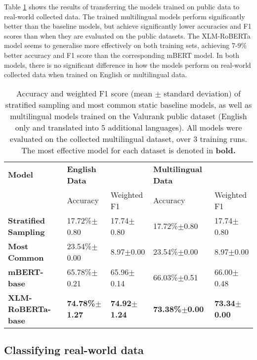 \documentclass{l4proj}
\begin{document}
Table \ref{table:transferability} shows the results of transferring the models trained on public data to real-world collected data. The trained multilingual models perform significantly better than the baseline models, but achieve significantly lower accuracies and F1 scores than when they are evaluated on the public datasets. The XLM-RoBERTa model seems to generalise more effectively on both training sets, achieving 7-9\% better accuracy and F1 score than the corresponding mBERT model. In both models, there is no significant difference in how the models perform on real-world collected data when trained on English or multilingual data.

\begin{table}[]
\begin{tabular}{lllll}
\hline
\textbf{Model}               & \textbf{English Data} &             & \textbf{Multilingual Data} &             \\ \cline{2-5} 
                             & Accuracy              & Weighted F1 & Accuracy                   & Weighted F1 \\ \hline
\textbf{Stratified Sampling} & 17.72\%$\pm$0.80     & 17.74$\pm$0.80 & 17.72\%$\pm$0.80     & 17.74$\pm$0.80            \\
\textbf{Most Common}         & 23.54\%$\pm$0.00     & 8.97$\pm$0.00 & 23.54\%$\pm$0.00     & 8.97$\pm$0.00 \\ \hline
\textbf{mBERT-base}          & 65.78\%$\pm$0.21     & 65.96$\pm$0.14         & 66.03\%$\pm$0.51        & 66.00$\pm$0.48         \\
\textbf{XLM-RoBERTa-base}    & \textbf{74.78\%$\pm$1.27}  & \textbf{74.92$\pm$1.24}        & \textbf{73.38\%$\pm$0.00}   & \textbf{73.34$\pm$0.00}        \\ \hline
\end{tabular}
\caption{Accuracy and weighted F1 score (mean $\pm$ standard deviation) of stratified sampling and most common static baseline models, as well as multilingual models trained on the Valurank public dataset (English only and translated into 5 additional languages). All models were evaluated on the collected multilingual dataset, over 3 training runs. The most effective model for each dataset is denoted in \textbf{bold.}}
\label{table:transferability}
\end{table}

\subsection{Classifying real-world data}
\end{document}
